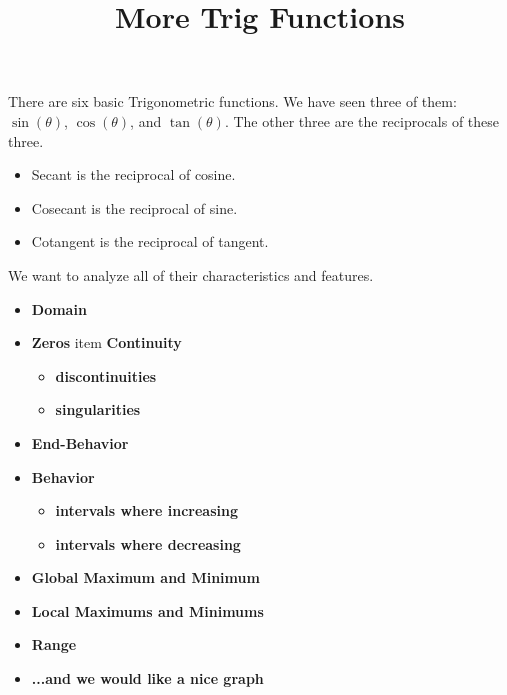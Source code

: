 \documentclass{ximera}
\title{More Trig Functions}
\begin{document}
\begin{abstract}
%
\end{abstract}
\maketitle



There are six basic Trigonometric functions.  We have seen three of them: $\sin(\theta)$, $\cos(\theta)$, and $\tan(\theta)$. The other three are the reciprocals of these three.


\begin{itemize}
\item Secant is the reciprocal of cosine.
\item Cosecant is the reciprocal of sine.
\item Cotangent is the reciprocal of tangent.
\end{itemize}


We want to analyze all of their characteristics and features. 




\begin{itemize}
\item \textbf{\textcolor{red!80!black}{Domain}} 
\item \textbf{\textcolor{red!80!black}{Zeros}} 
item \textbf{\textcolor{red!80!black}{Continuity}} 
  \begin{itemize}
     \item \textbf{\textcolor{purple!85!blue}{discontinuities}} 
     \item \textbf{\textcolor{purple!85!blue}{singularities}} 
  \end{itemize}
\item \textbf{\textcolor{red!80!black}{End-Behavior}} 
\item \textbf{\textcolor{red!80!black}{Behavior}} 
  \begin{itemize}
     \item \textbf{\textcolor{purple!85!blue}{intervals where increasing}} 
     \item \textbf{\textcolor{purple!85!blue}{intervals where decreasing}} 
  \end{itemize}
\item \textbf{\textcolor{red!80!black}{Global Maximum and Minimum}} 
\item \textbf{\textcolor{red!80!black}{Local Maximums and Minimums}} 
\item \textbf{\textcolor{red!80!black}{Range}} 
\item \textbf{\textcolor{blue!55!black}{...and we would like a nice graph}} 
\end{itemize}
\end{document}
